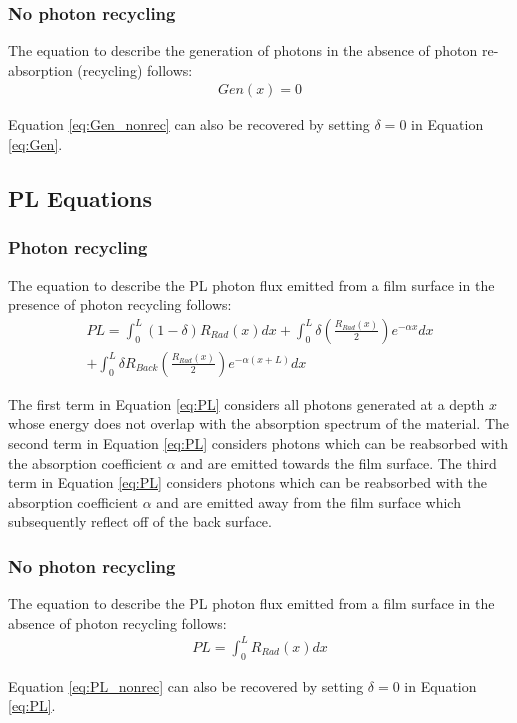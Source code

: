 \documentclass[11pt]{article}
\begin{document}
\subsubsection*{No photon recycling}
\par The equation to describe the generation of photons in the absence of photon re-absorption (recycling) follows:
\begin{equation} \label{eq:Gen_nonrec}
	\begin{split}
		Gen(x) = 0
	\end{split}
\end{equation}

\par Equation \ref{eq:Gen_nonrec} can also be recovered by setting $ \delta = 0 $ in Equation \ref{eq:Gen}.

\subsection{PL Equations}
\subsubsection*{Photon recycling}
\par The equation to describe the PL photon flux emitted from a film surface in the presence of photon recycling follows:
\begin{equation} \label{eq:PL}
	\begin{split}
		PL = \int_{0}^{L} (1-\delta)R_{Rad}(x)dx + \int_{0}^{L} \delta \left(\frac{R_{Rad}(x)}{2}\right) e^{-\alpha x} dx\\
		+ \int_{0}^{L} \delta R_{Back} \left(\frac{R_{Rad}(x)}{2}\right) e^{-\alpha (x+L)} dx
	\end{split}
\end{equation}
\par The first term in Equation \ref{eq:PL} considers all photons generated at a depth $ x $ whose energy does not overlap with the absorption spectrum of the material. The second term in Equation \ref{eq:PL} considers photons which can be reabsorbed with the absorption coefficient $ \alpha $ and are emitted towards the film surface. The third term in Equation \ref{eq:PL} considers photons which can be reabsorbed with the absorption coefficient $ \alpha $ and are emitted away from the film surface which subsequently reflect off of the back surface.
\subsubsection*{No photon recycling}
\par The equation to describe the PL photon flux emitted from a film surface in the absence of photon recycling follows:
\begin{equation} \label{eq:PL_nonrec}
\begin{split}
	PL = \int_{0}^{L} R_{Rad}(x)dx
\end{split}
\end{equation}
 \par Equation \ref{eq:PL_nonrec} can also be recovered by setting $ \delta = 0 $ in Equation \ref{eq:PL}.
	
\end{document}
